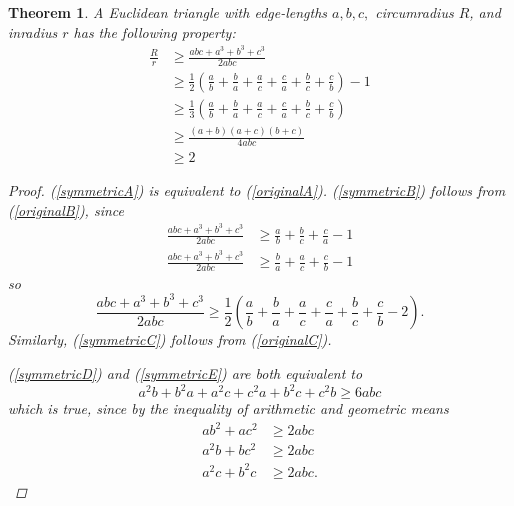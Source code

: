 \documentclass[12pt,notitlepage]{amsart}%
\newtheorem{theorem}{Theorem}[section]
\newcommand{\fracsum}{\frac{a}{b}+\frac{b}{c}+\frac{c}{a}}
\newcommand{\fracsym}{\frac{a}{b}+\frac{b}{a}+\frac{a}{c}+\frac{c}{a}+\frac{b}{c}+\frac{c}{b}}
\begin{document}
\begin{theorem}\label{symmetric}
A Euclidean triangle with edge-lengths $a,b,c,$ circumradius $R$, and inradius $r$ has the following property:
	\begin{subequations}
    \begin{align}
		\frac{R}{r}&\geq\frac{abc+a^3+b^3+c^3}{2abc}\label{symmetricA}\\
    	&\geq \frac{1}{2}\left( \fracsym\right)\label{symmetricB} -1\\
        &\geq \frac{1}{3}\left( \fracsym\right)\label{symmetricC}\\
        &\geq\frac{(a+b)(a+c)(b+c)}{4abc}\label{symmetricD}\\
        &\geq 2\label{symmetricE}
    \end{align}
	\end{subequations}
    \begin{proof}
	(\ref{symmetricA}) is equivalent to (\ref{originalA}). (\ref{symmetricB}) follows from (\ref{originalB}), since
    \begin{align*}
	\frac{abc+a^3+b^3+c^3}{2abc}&\geq \fracsum-1\\
    \frac{abc+a^3+b^3+c^3}{2abc}&\geq \frac{b}{a}+\frac{a}{c}+\frac{c}{b}-1
	\end{align*}
    so
    \[\frac{abc+a^3+b^3+c^3}{2abc}\geq \frac{1}{2}\left( \fracsym -2\right).\]
    Similarly, (\ref{symmetricC}) follows from (\ref{originalC}).
    
    (\ref{symmetricD}) and (\ref{symmetricE}) are both equivalent to 
    \[a^2b+b^2a+a^2c+c^2a+b^2c+c^2b\geq6abc\]
    which is true, since by the inequality of arithmetic and geometric means
    \begin{align*}
    	ab^2+ac^2&\geq2abc\\
        a^2b+bc^2&\geq2abc\\
        a^2c+b^2c&\geq2abc.
    \end{align*}
    \end{proof}
\end{theorem}
\end{document}
